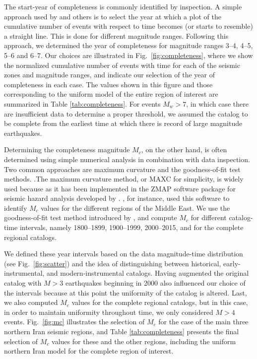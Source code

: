 The start-year of completeness is commonly identified by inspection. A simple approach used by \citet{Frankel1995} and others is to select the year at which a plot of the cumulative number of events with respect to time becomes (or starts to resemble) a straight line. This is done for different magnitude ranges. Following this approach, we determined the year of completeness for magnitude ranges 3--4, 4--5, 5--6 and 6--7. Our choices are illustrated in Fig.~\ref{fig:completeness}, where we show the normalized cumulative number of events with time for each of the seismic zones and magnitude ranges, and indicate our selection of the year of completeness in each case. The values shown in this figure and those corresponding to the uniform model of the entire region of interest are summarized in Table \ref{tab:completeness}. For events $M_w>7$, in which case there are insufficient data to determine a proper threshold, we assumed the catalog to be complete from the earliest time at which there is record of large magnitude earthquakes.

Determining the completeness magnitude $M_c$, on the other hand, is often determined using simple numerical analysis in combination with data inspection. Two common approaches are maximum curvature and the goodness-of-fit test methods. .The maximum curvature method, or MAXC for simplicity, is widely used because as it has been implemented in the ZMAP software package for seismic hazard analysis developed by \citet{Wiemer2001}. \citet{Zare2014}, for instance, used this software to identify $M_c$ values for the different regions of the Middle East.  We use the goodness-of-fit test method introduced by \citet{Wiemer2000}, and compute $M_c$ for different catalog-time intervals, namely 1800--1899, 1900--1999, 2000--2015, and for the complete regional catalogs.

We defined these year intervals based on the data magnitude-time distribution (see Fig.~\ref{fig:scatter}) and the idea of distinguishing between historical, early-instrumental, and modern-instrumental catalogs. Having augmented the original catalog with $M>3$ earthquakes beginning in 2000 also influenced our choice of the intervals because at this point the uniformity of the catalog is altered. Last, we also computed $M_c$ values for the complete regional catalogs, but in this case, in order to maintain uniformity throughout time, we only considered $M>4$ events. Fig.~\ref{fig:mc} illustrates the selection of $M_c$ for the case of the main three northern Iran seismic regions, and Table \ref{tab:completeness} presents the final selection of $M_c$ values for these and the other regions, including the uniform northern Iran model for the complete region of interest.

